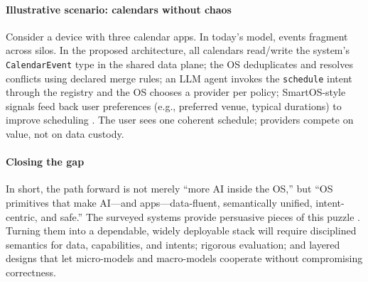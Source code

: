 \documentclass{article}
\begin{document}
\paragraph{Illustrative scenario: calendars without chaos}
Consider a device with three calendar apps. In today’s model, events fragment across silos. In the proposed architecture, all calendars read/write the system’s \texttt{CalendarEvent} type in the shared data plane; the OS deduplicates and resolves conflicts using declared merge rules; an LLM agent invokes the \texttt{schedule} intent through the registry and the OS chooses a provider per policy; SmartOS-style signals feed back user preferences (e.g., preferred venue, typical durations) to improve scheduling \cite{goodarzy2021smartos,he2024peros}. The user sees one coherent schedule; providers compete on value, not on data custody.

\paragraph{Closing the gap}
In short, the path forward is not merely “more AI inside the OS,” but “OS primitives that make AI—and apps—data-fluent, semantically unified, intent-centric, and safe.” The surveyed systems provide persuasive pieces of this puzzle \cite{zhang2024systematic,liu2021serviceos,hao2020linnos,bateni2020neuos,goodarzy2021smartos,kamath2024llamas,he2024peros,packer2023memgpt}. Turning them into a dependable, widely deployable stack will require disciplined semantics for data, capabilities, and intents; rigorous evaluation; and layered designs that let micro-models and macro-models cooperate without compromising correctness.
\end{document}
